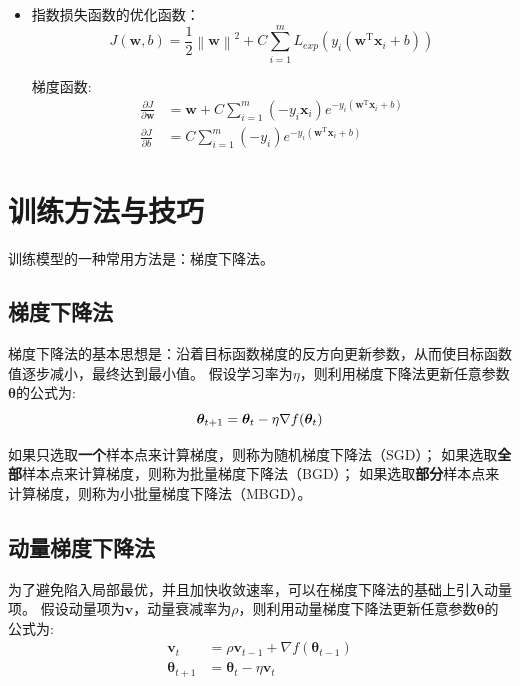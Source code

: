\documentclass[withoutpreface,bwprint]{NoteBook}
\begin{document}
\begin{itemize}
    \item 指数损失函数的优化函数：
    \begin{equation}
        \label{eq:指数损失函数的优化函数}
        J(\mathbf{w},b) = \frac{1}{2}\left\| \mathbf{w} \right\|^2 + C \sum_{i=1}^{m} L_{exp}(y_i(\mathbf{w}^\mathrm{T} \mathbf{x}_i + b))
    \end{equation}

    梯度函数:
    \begin{align}
        \label{eq:指数损失函数的优化函数的梯度函数}
        \frac{\partial J}{\partial \mathbf{w}} &= 
        \mathbf{w} + C \sum_{i=1}^{m}(-y_i \mathbf{x}_i) e^{-y_i(\mathbf{w}^\mathrm{T} \mathbf{x}_i + b)}\\
        \frac{\partial J}{\partial b} &= 
        C \sum_{i=1}^{m}(-y_i) e^{-y_i(\mathbf{w}^\mathrm{T} \mathbf{x}_i + b)}
    \end{align}

\end{itemize}

\section{训练方法与技巧}
训练模型的一种常用方法是：梯度下降法。
\subsection{梯度下降法}
梯度下降法的基本思想是：沿着目标函数梯度的反方向更新参数，从而使目标函数值逐步减小，最终达到最小值。
假设学习率为$\eta$，则利用梯度下降法更新任意参数$\bm{\theta}$的公式为:
\begin{equation}
    \label{eq:梯度下降法的参数更新公式}
    \bm{\theta}_{t+1} =  \bm{\theta}_t - \eta \nabla f (\bm{\theta}_t) \\
\end{equation}

如果只选取\textbf{一个}样本点来计算梯度，则称为随机梯度下降法（SGD）；
如果选取\textbf{全部}样本点来计算梯度，则称为批量梯度下降法（BGD）；
如果选取\textbf{部分}样本点来计算梯度，则称为小批量梯度下降法（MBGD）。

\subsection{动量梯度下降法}
为了避免陷入局部最优，并且加快收敛速率，可以在梯度下降法的基础上引入动量项。
假设动量项为$\mathbf{v}$，动量衰减率为$\rho$，则利用动量梯度下降法更新任意参数$\bm{\theta}$的公式为:
\begin{align}
    \label{eq:动量梯度下降法的参数更新公式}
    \mathbf{v}_{t} &= \rho \mathbf{v}_{t-1} + \nabla f (\bm{\theta}_{t-1}) \\
    \bm{\theta}_{t+1} &=  \bm{\theta}_t - \eta \mathbf{v}_{t}
\end{align}
\end{document}
